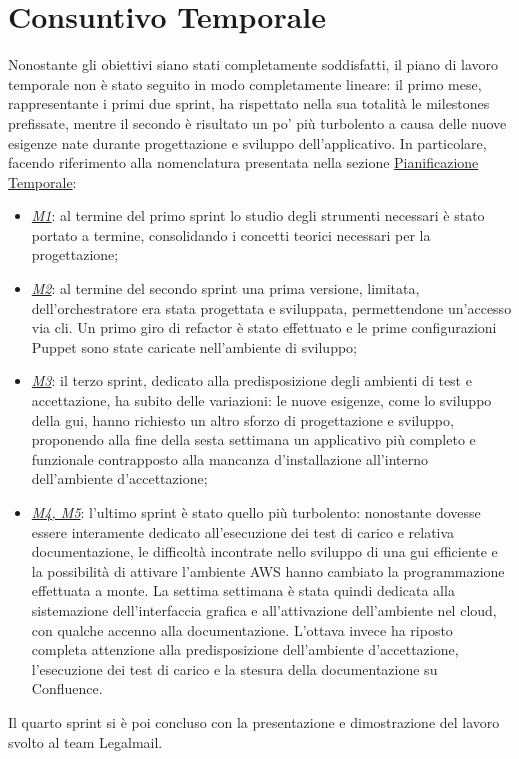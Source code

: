 \section{Consuntivo Temporale}
Nonostante gli obiettivi siano stati completamente soddisfatti, il piano di lavoro temporale non è stato seguito in modo completamente lineare: il primo mese, rappresentante i primi due sprint, ha rispettato nella sua totalità le milestones prefissate, mentre il secondo è risultato un po' più turbolento a causa delle nuove esigenze nate durante progettazione e sviluppo dell'applicativo.
In particolare, facendo riferimento alla nomenclatura presentata nella sezione \hyperref[subsec:pianificazione]{Pianificazione Temporale}: 
\begin{itemize}
	\item \underline{\textit{M1}}: al termine del primo sprint lo studio degli strumenti necessari è stato portato a termine, consolidando i concetti teorici necessari per la progettazione;
	\item \underline{\textit{M2}}: al termine del secondo sprint una prima versione, limitata, dell'orchestratore era stata progettata e sviluppata, permettendone un'accesso via \gls{cli}. Un primo giro di \gls{refactor} è stato effettuato e le prime configurazioni Puppet sono state caricate nell'ambiente di sviluppo;
	\item \underline{\textit{M3}}: il terzo sprint, dedicato alla predisposizione degli ambienti di test e accettazione, ha subito delle variazioni: le nuove esigenze, come lo sviluppo della \gls{gui}, hanno richiesto un altro sforzo di progettazione e sviluppo, proponendo alla fine della sesta settimana un applicativo più completo e funzionale contrapposto alla mancanza d'installazione all'interno dell'ambiente d'accettazione;
	\item \underline{\textit{M4, M5}}: l'ultimo sprint è stato quello più turbolento: nonostante dovesse essere interamente dedicato all'esecuzione dei test di carico e relativa documentazione, le difficoltà incontrate nello sviluppo di una \gls{gui} efficiente e la possibilità di attivare l'ambiente AWS hanno cambiato la programmazione effettuata a monte. La settima settimana è stata quindi dedicata alla sistemazione dell'interfaccia grafica e all'attivazione dell'ambiente nel \gls{cloud}, con qualche accenno alla documentazione. L'ottava invece ha riposto completa attenzione alla predisposizione dell'ambiente d'accettazione, l'esecuzione dei test di carico e la stesura della documentazione su Confluence.
\end{itemize}
Il quarto sprint si è poi concluso con la presentazione e dimostrazione del lavoro svolto al team Legalmail.
